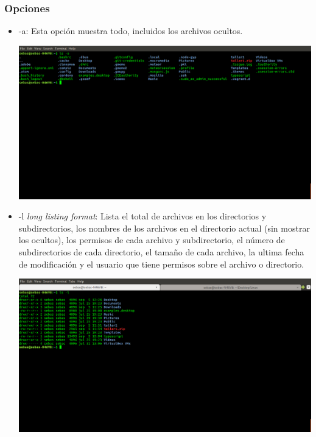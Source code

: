 \documentclass{article}
\begin{document}
\subsubsection{Opciones}
\begin{itemize}
	\item -a: Esta opción muestra todo, incluidos los archivos ocultos.\par
	    \begin{minipage}{\linewidth}
            \centering
            \includegraphics[width=\textwidth]{ls-a.png}
        \end{minipage}
    \item -l \emph{long listing format}: Lista el total de archivos en los directorios y subdirectorios, los nombres de los archivos en el directorio actual (sin mostrar los ocultos), los permisos de cada archivo y subdirectorio, el número de subdirectorios de cada directorio, el tamaño de cada archivo, la ultima fecha de modificación y el usuario que tiene permisos sobre el archivo o directorio.\par
	    \begin{minipage}{\linewidth}
            \centering
            \includegraphics[width=\textwidth]{ls-l.png}

\end{minipage}
\end{itemize}
\end{document}
